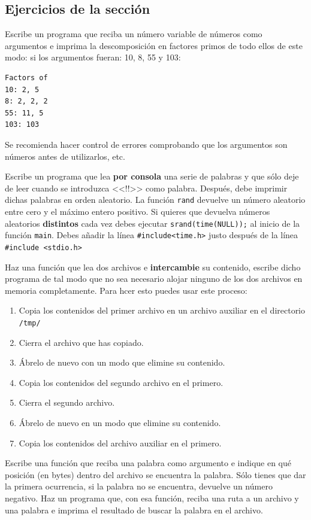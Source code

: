 \documentclass[a4paper]{article}
\begin{document}
\subsection{Ejercicios de la sección}
\begin{exercises}[resume*]
\item Escribe un programa que reciba un número variable de números como
argumentos e imprima la descomposición en factores primos de todo ellos de este
modo: si los argumentos fueran: 10, 8, 55 y 103:

\noindent
\begin{minipage}[H]{\linewidth}
\mbox{}
\begin{verbatim}
Factors of
10: 2, 5
8: 2, 2, 2
55: 11, 5
103: 103
\end{verbatim}
\end{minipage}

Se recomienda hacer control de errores comprobando que los argumentos son
números antes de utilizarlos, etc.
\item Escribe un programa que lea \textbf{por consola} una serie de palabras
y que sólo deje de leer cuando se introduzca <<!!>> como palabra. Después, debe
imprimir dichas palabras en orden aleatorio. La función \verb!rand! devuelve
un número aleatorio entre cero y el máximo entero positivo. Si quieres que
devuelva números aleatorios \textbf{distintos} cada vez debes ejecutar
\verb!srand(time(NULL));! al inicio de la función \verb!main!. Debes añadir
la línea \verb!#include<time.h>! justo después de la línea
\verb!#include <stdio.h>!

\item Haz una función que lea dos archivos e \textbf{intercambie} su contenido,
escribe dicho programa de tal modo que no sea necesario alojar ninguno de los
dos archivos en memoria completamente. Para hcer esto puedes usar este proceso:
\begin{enumerate}
\item Copia los contenidos del primer archivo
en un archivo auxiliar en el directorio \verb!/tmp/!
\item Cierra el archivo que has copiado.
\item Ábrelo de nuevo con un modo que elimine su contenido.
\item Copia los contenidos del segundo archivo en el primero.
\item Cierra el segundo archivo.
\item Ábrelo de nuevo en un modo que elimine su contenido.
\item Copia los contenidos del archivo auxiliar en el primero.
\end{enumerate}

\item Escribe una función que reciba una palabra como argumento e indique
en qué posición (en bytes) dentro del archivo se encuentra la palabra. Sólo
tienes que dar la primera ocurrencia, si la palabra no se encuentra, devuelve
un número negativo. Haz un programa que, con esa función, reciba una ruta a un
archivo y una palabra e imprima el resultado de buscar la palabra en el archivo.
\end{exercises}
\end{document}
